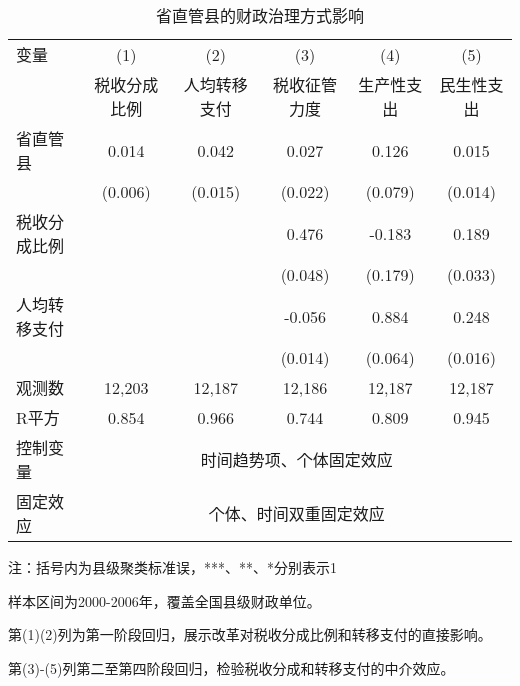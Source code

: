 \begin{table}[!htbp]
\footnotesize
\centering
\caption{省直管县的财政治理方式影响}\label{tab:mechanism}
\begin{threeparttable}
\begin{tabular}{lccccc}
\toprule
变量 & (1) & (2) & (3) & (4) & (5) \\
 & 税收分成比例 & 人均转移支付 & 税收征管力度 & 生产性支出 & 民生性支出 \\
\midrule
省直管县 & 0.014\tnote{**} & 0.042\tnote{***} & 0.027 & 0.126 & 0.015 \\
 & (0.006) & (0.015) & (0.022) & (0.079) & (0.014) \\
\addlinespace[0.5ex]
税收分成比例 & & & 0.476\tnote{***} & -0.183 & 0.189\tnote{***} \\
 & & & (0.048) & (0.179) & (0.033) \\
\addlinespace[0.5ex]
人均转移支付 & & & -0.056\tnote{***} & 0.884\tnote{***} & 0.248\tnote{***} \\
 & & & (0.014) & (0.064) & (0.016) \\
\midrule
观测数 & 12,203 & 12,187 & 12,186 & 12,187 & 12,187 \\
R平方 & 0.854 & 0.966 & 0.744 & 0.809 & 0.945 \\
控制变量 & \multicolumn{5}{c}{时间趋势项、个体固定效应} \\
固定效应 & \multicolumn{5}{c}{个体、时间双重固定效应} \\
\bottomrule
\end{tabular}

\begin{tablenotes}
\scriptsize
\item 注：括号内为县级聚类标准误，***、**、*分别表示1%
\item 样本区间为2000-2006年，覆盖全国县级财政单位。
\item 第(1)(2)列为第一阶段回归，展示改革对税收分成比例和转移支付的直接影响。
\item 第(3)-(5)列第二至第四阶段回归，检验税收分成和转移支付的中介效应。
\end{tablenotes}
\end{threeparttable}
\end{table}
